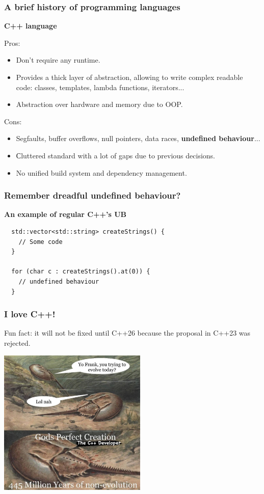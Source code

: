 \documentclass[aspectratio=1610,t]{beamer}
\begin{document}

\begin{frame}
\frametitle{A brief history of programming languages}
\textbf{C++ language}

Pros:
\begin{itemize}
    \item Don't require any runtime.
    \item Provides a thick layer of abstraction, allowing to write complex readable code: classes, templates, lambda functions, iterators...
    \item Abstraction over hardware and memory due to OOP.
\end{itemize}

Cons:
\begin{itemize}
    \item Segfaults, buffer overflows, null pointers, data races, \textbf{undefined behaviour}...
    \item Сluttered standard with a lot of gaps due to previous decisions.
    \item No unified build system and dependency management.
\end{itemize}
\end{frame}


\begin{frame}[fragile]
\frametitle{Remember dreadful undefined behaviour?}
\textbf{An example of regular C++'s UB}

\begin{verbatim}
  std::vector<std::string> createStrings() {
    // Some code
  }

  for (char c : createStrings().at(0)) {
    // undefined behaviour
  }
\end{verbatim}
\end{frame}


\begin{frame}[fragile]
\frametitle{I love C++!}
Fun fact: it will not be fixed until C++26 because the proposal in C++23 was rejected.

\begin{center}
    \includegraphics[width=\textwidth,height=7cm,keepaspectratio]{images/cpp-meme.jpg}
\end{center}
\end{frame}
\end{document}
